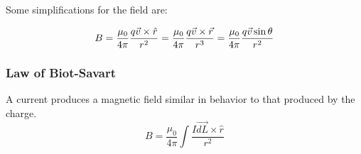 \documentclass{article}
\begin{document}
Some simplifications for the field are:

 $$B=\frac{\mu_0}{4\pi} \frac{q\vec{v}\times \hat{r}}{r^2}=\\
 \frac{\mu_0}{4\pi} \frac{q\vec{v}\times \vec{r}}{r^3}=\\
 \frac{\mu_0}{4\pi} \frac{q\vec{v}\sin{\theta}}{r^2}$$

 \subsubsection{Law of Biot-Savart}
 A current produces a magnetic field similar in behavior to that produced by
 the charge.
 $$B=\frac{\mu_0}{4\pi} \int{\frac{I \vec{dL}\times\hat{r}}{r^2}}$$
\end{document}

